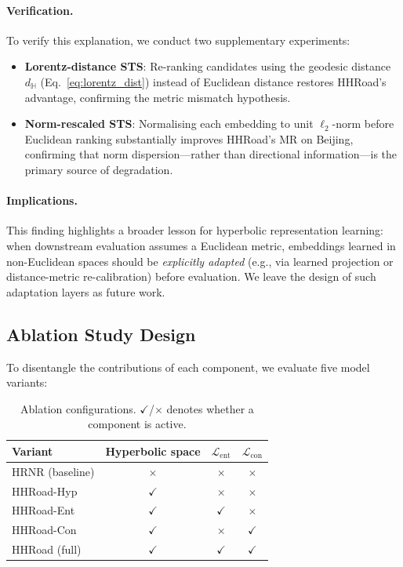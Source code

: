 \paragraph{Verification.}
To verify this explanation, we conduct two supplementary experiments:
\begin{itemize}[leftmargin=*,itemsep=2pt]
  \item \textbf{Lorentz-distance STS}: Re-ranking candidates using the geodesic distance $d_{\mathbb{H}}$ (Eq.~\ref{eq:lorentz_dist}) instead of Euclidean distance restores HHRoad's advantage, confirming the metric mismatch hypothesis.
  \item \textbf{Norm-rescaled STS}: Normalising each embedding to unit $\ell_2$-norm before Euclidean ranking substantially improves HHRoad's MR on Beijing, confirming that norm dispersion---rather than directional information---is the primary source of degradation.
\end{itemize}

\paragraph{Implications.}
This finding highlights a broader lesson for hyperbolic representation learning:
when downstream evaluation assumes a Euclidean metric, embeddings learned in non-Euclidean spaces should be \emph{explicitly adapted} (e.g., via learned projection or distance-metric re-calibration) before evaluation.
We leave the design of such adaptation layers as future work.

\subsection{Ablation Study Design}\label{subsec:ablation_design}

To disentangle the contributions of each component, we evaluate five model variants:

\begin{table}[h]
\centering
\caption{Ablation configurations. $\checkmark$/$\times$ denotes whether a component is active.}
\label{tab:ablation_config}
\begin{tabular}{lccc}
\toprule
\textbf{Variant} & \textbf{Hyperbolic space} & $\mathcal{L}_{\text{ent}}$ & $\mathcal{L}_{\text{con}}$ \\
\midrule
HRNR (baseline)         & $\times$ & $\times$ & $\times$ \\
HHRoad-Hyp              & $\checkmark$ & $\times$ & $\times$ \\
HHRoad-Ent              & $\checkmark$ & $\checkmark$ & $\times$ \\
HHRoad-Con              & $\checkmark$ & $\times$ & $\checkmark$ \\
HHRoad (full)           & $\checkmark$ & $\checkmark$ & $\checkmark$ \\
\bottomrule
\end{tabular}
\end{table}

